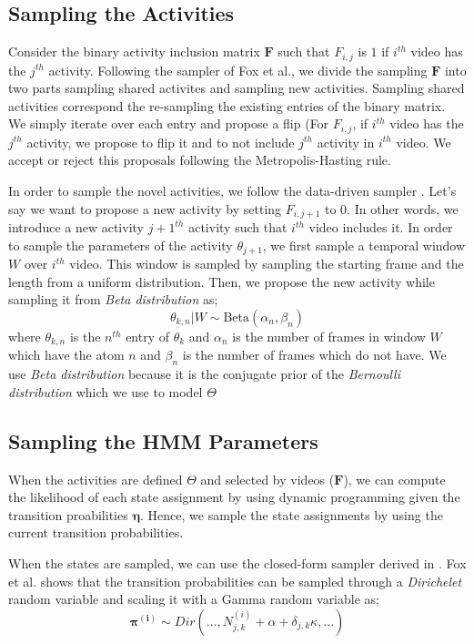 \documentclass[10pt,twocolumn,letterpaper]{article}
\begin{document}
\subsection{Sampling the Activities}
Consider the binary activity inclusion matrix $\mathbf{F}$ such that $F_{i,j}$ is $1$ if $i^{th}$ video has the $j^{th}$ activity. Following the sampler of Fox et al.\cite{foxBPHMM}, we divide the sampling $\mathbf{F}$ into two parts sampling shared activites and sampling new activities. Sampling shared activities correspond the re-sampling the existing entries of the binary matrix. We simply iterate over each entry and propose a flip (\ie For $F_{i,j}$, if $i^{th}$ video has the $j^{th}$ activity, we propose to flip it and to not include $j^{th}$ activity in $i^{th}$ video. We accept or reject this proposals following the Metropolis-Hasting rule.

In order to sample the novel activities, we follow the data-driven sampler \cite{npActivity}. Let's say we want to propose a new activity by setting $F_{i,j+1}$ to $0$. In other words, we introduce a new activity $j+1^{th}$ activity such that $i^{th}$ video includes it. In order to sample the parameters of the activity $\theta_{j+1}$, we first sample a temporal window $W$ over $i^{th}$ video. This window is sampled by sampling the starting frame and the length from a uniform distribution. Then, we propose the new activity while sampling it from \emph{Beta distribution} as;
\begin{equation}
  \theta_{k,n}|W \sim \text{Beta}(\alpha_n,\beta_n)
\end{equation}
where $\theta_{k,n}$ is the $n^{th}$ entry of $\theta_k$ and $\alpha_n$ is the number of frames in window $W$ which have the atom $n$ and $\beta_n$ is the number of frames which do not have. We use \emph{Beta distribution} because it is the conjugate prior of the \emph{Bernoulli distribution} which we use to model $\Theta$

\subsection{Sampling the HMM Parameters}
When the activities are defined $\Theta$ and selected by videos ($\mathbf{F}$), we can compute the likelihood of each state assignment by using dynamic programming given the transition proabilities $\mathbf{\eta}$. Hence, we sample the state assignments by using the current transition probabilities.

When the states are sampled, we can use the closed-form sampler derived in \cite{npActivity}. Fox et al.\cite{foxBPHMM} shows that the transition probabilities can be sampled through a \emph{Dirichelet} random variable and scaling it with a Gamma random variable as;
\begin{equation}
  \mathbf{\pi^{(i)}} \sim Dir(\ldots,N^{(i)}_{j,k}+\alpha+\delta_{j,k}\kappa,\ldots)
\end{equation}
\end{document}
